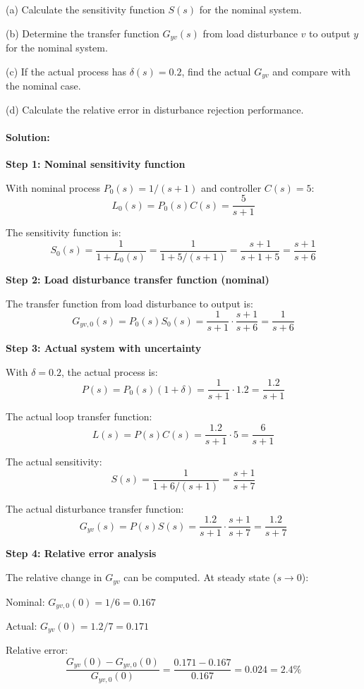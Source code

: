\documentclass[11pt,a4paper]{article}
\begin{document}
(a) Calculate the sensitivity function $S(s)$ for the nominal system.

(b) Determine the transfer function $G_{yv}(s)$ from load disturbance $v$ to output $y$ for the nominal system.

(c) If the actual process has $\delta(s) = 0.2$, find the actual $G_{yv}$ and compare with the nominal case.

(d) Calculate the relative error in disturbance rejection performance.

\paragraph{Solution:}

\textbf{Step 1: Nominal sensitivity function}

With nominal process $P_0(s) = 1/(s+1)$ and controller $C(s) = 5$:
\[
L_0(s) = P_0(s)C(s) = \frac{5}{s+1}
\]

The sensitivity function is:
\[
S_0(s) = \frac{1}{1 + L_0(s)} = \frac{1}{1 + 5/(s+1)} = \frac{s+1}{s+1+5} = \frac{s+1}{s+6}
\]

\textbf{Step 2: Load disturbance transfer function (nominal)}

The transfer function from load disturbance to output is:
\[
G_{yv,0}(s) = P_0(s)S_0(s) = \frac{1}{s+1} \cdot \frac{s+1}{s+6} = \frac{1}{s+6}
\]

\textbf{Step 3: Actual system with uncertainty}

With $\delta = 0.2$, the actual process is:
\[
P(s) = P_0(s)(1 + \delta) = \frac{1}{s+1} \cdot 1.2 = \frac{1.2}{s+1}
\]

The actual loop transfer function:
\[
L(s) = P(s)C(s) = \frac{1.2}{s+1} \cdot 5 = \frac{6}{s+1}
\]

The actual sensitivity:
\[
S(s) = \frac{1}{1 + 6/(s+1)} = \frac{s+1}{s+7}
\]

The actual disturbance transfer function:
\[
G_{yv}(s) = P(s)S(s) = \frac{1.2}{s+1} \cdot \frac{s+1}{s+7} = \frac{1.2}{s+7}
\]

\textbf{Step 4: Relative error analysis}

The relative change in $G_{yv}$ can be computed. At steady state ($s \to 0$):

Nominal: $G_{yv,0}(0) = 1/6 = 0.167$

Actual: $G_{yv}(0) = 1.2/7 = 0.171$

Relative error:
\[
\frac{G_{yv}(0) - G_{yv,0}(0)}{G_{yv,0}(0)} = \frac{0.171 - 0.167}{0.167} = 0.024 = 2.4\%
\]
\end{document}
